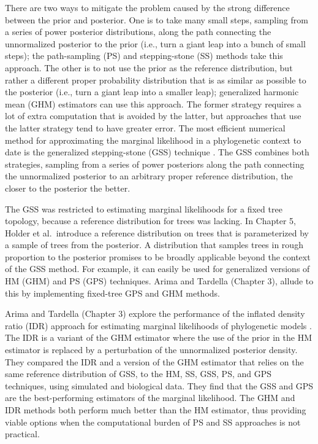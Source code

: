 \documentclass[letterpaper,12pt]{article}
\begin{document}
There are two ways to mitigate the problem caused by the strong difference
between the prior and posterior.
One is to take many small steps, sampling from a series of power posterior
distributions, along the path connecting the unnormalized posterior to the
prior (i.e., turn a giant leap into a bunch of small steps);
the path-sampling (PS) \citep{Lartillot2006} and stepping-stone (SS)
\citep{Xie2011} methods take this approach.
The other is to not use the prior as the reference distribution, but rather a
different proper probability distribution that is as similar as possible to the
posterior (i.e., turn a giant leap into a smaller leap); 
generalized harmonic mean (GHM) estimators \citep{Gelfand1994} can use
this approach.
The former strategy requires a lot of extra computation that is avoided by the
latter, but approaches that use the latter strategy tend to have greater error.
The most efficient numerical method for approximating the marginal likelihood
in a phylogenetic context to date is the generalized stepping-stone (GSS)
technique \citep{Fan2011}.
The GSS combines both strategies, sampling from a series of power
posteriors along the path connecting the unnormalized posterior to
an arbitrary proper reference distribution, the closer to the
posterior the better.


The GSS was restricted to estimating marginal likelihoods for a fixed tree
topology, because a reference distribution for trees was lacking.
In Chapter 5, Holder et al.\ introduce a reference distribution on trees that
is parameterized by a sample of trees from the posterior.
A distribution that samples trees in rough proportion to the posterior promises
to be broadly applicable beyond the context of the GSS method.
For example, it can easily be used for generalized versions of HM (GHM) and PS
(GPS) techniques.
Arima and Tardella (Chapter 3), allude to this by implementing fixed-tree GPS
and GHM methods.


Arima and Tardella (Chapter 3) explore the performance of the inflated density
ratio (IDR) approach for estimating marginal likelihoods of phylogenetic models
\citep{Arima2012}.
The IDR is a variant of the GHM estimator where the use of the prior in the HM
estimator is replaced by a perturbation of the unnormalized posterior density.
They compared the IDR and a version of the GHM estimator that relies on the
same reference distribution of GSS, to the HM, SS, GSS, PS, and GPS techniques,
using simulated and biological data.
They find that the GSS and GPS are the best-performing estimators of the
marginal likelihood.
The GHM and IDR methods both perform much better than the HM estimator, thus
providing viable options when the computational burden of PS and SS approaches
is not practical.
\end{document}
